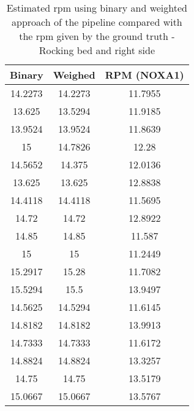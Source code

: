 \begin{table}[h]
    \centering
    \begin{tabular}{|c|c|c|}
 
    \hline 
    Binary & Weighed & RPM (NOXA1) \\  
\hline 
14.2273    &  14.2273   &   11.7955 \\ 
13.625    &  13.5294  &    11.9185 \\ 
13.9524    &  13.9524  &    11.8639 \\ 
15  &    14.7826    &    12.28 \\ 
14.5652    &   14.375  &    12.0136 \\ 
13.625    &   13.625   &   12.8838 \\ 
14.4118    &  14.4118  &    11.5695 \\ 
14.72    &    14.72  &    12.8922 \\ 
14.85    &    14.85    &   11.587 \\ 
15       &    15  &    11.2449 \\ 
15.2917   &     15.28  &    11.7082 \\ 
15.5294   &      15.5   &   13.9497 \\ 
14.5625   &   14.5294  &    11.6145 \\ 
14.8182   &   14.8182   &   13.9913 \\ 
14.7333   &   14.7333  &    11.6172 \\ 
14.8824   &   14.8824  &    13.3257 \\ 
14.75     &   14.75   &   13.5179 \\ 
15.0667   &   15.0667  &    13.5767 \\ 
\hline 
\end{tabular}
\caption{Estimated rpm using binary and weighted approach of the pipeline
compared with the rpm given by the ground truth
- Rocking bed and right side}
\label{tab:RightMovsg}

\end{table}